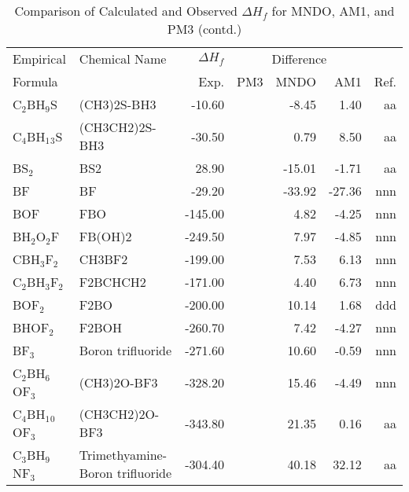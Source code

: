 \begin{table}
\caption{Comparison of Calculated and Observed $\Delta H_f$ 
for MNDO, AM1, and PM3 (contd.)}
\begin{center}
\compresstable
\begin{tabular}{llrrrrr}
Empirical & Chemical Name & $\Delta H_f$ & \multicolumn{3}{c}{Difference} & \\
Formula   &               & Exp. & PM3 &  MNDO  &  AM1 &     Ref.\\
\hline
 C$_2$BH$_9$S      & (CH3)2S-BH3                           &   -10.60    &  &    -8.45  &     1.40  &     aa\\
 C$_4$BH$_1$$_3$S     & (CH3CH2)2S-BH3                        &   -30.50    &  &     0.79  &     8.50  &     aa\\
 BS$_2$         & BS2                                   &    28.90    &  &   -15.01  &    -1.71  &     aa\\
 BF          & BF                                    &   -29.20    &  &   -33.92  &   -27.36  &    nnn\\
 BOF         & FBO                                   &  -145.00    &  &     4.82  &    -4.25  &    nnn\\
 BH$_2$O$_2$F      & FB(OH)2                               &  -249.50    &  &     7.97  &    -4.85  &    nnn\\
 CBH$_3$F$_2$      & CH3BF2                                &  -199.00    &  &     7.53  &     6.13  &    nnn\\
 C$_2$BH$_3$F$_2$     & F2BCHCH2                              &  -171.00    &  &     4.40  &     6.73  &    nnn\\
 BOF$_2$        & F2BO                                  &  -200.00    &  &    10.14  &     1.68  &    ddd\\
 BHOF$_2$       & F2BOH                                 &  -260.70    &  &     7.42  &    -4.27  &    nnn\\
 BF$_3$         & Boron trifluoride                     &  -271.60    &  &    10.60  &    -0.59  &    nnn\\
 C$_2$BH$_6$OF$_3$    & (CH3)2O-BF3                           &  -328.20    &  &    15.46  &    -4.49  &    nnn\\
 C$_4$BH$_1$$_0$OF$_3$   & (CH3CH2)2O-BF3                        &  -343.80    &  &    21.35  &     0.16  &     aa\\
 C$_3$BH$_9$NF$_3$    & Trimethyamine-Boron trifluoride       &  -304.40    &  &    40.18  &    32.12  &     aa\\

\end{tabular}
\end{center}
\end{table}
